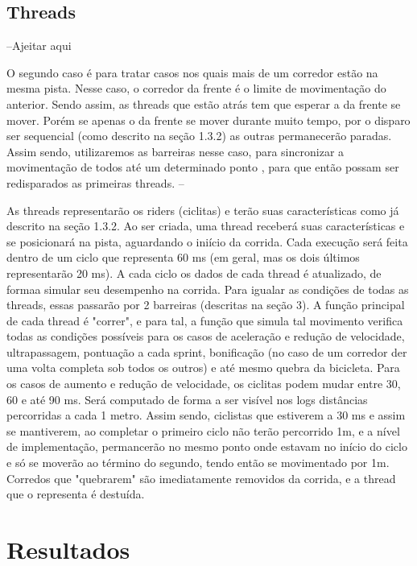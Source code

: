 \documentclass[12pt,a4paper]{article}
\begin{document}
\subsection{Threads}

--Ajeitar aqui

    O segundo caso é para tratar casos nos quais mais de um corredor estão na mesma pista. Nesse caso, o corredor da frente é o limite de movimentação do anterior. Sendo assim, as threads que estão atrás tem que esperar a da frente se mover. Porém se apenas o da frente se mover durante muito tempo, por o disparo ser sequencial (como descrito na seção 1.3.2) as outras permanecerão paradas. Assim sendo, utilizaremos as barreiras nesse caso, para sincronizar a movimentação de todos até um determinado ponto , para que então possam ser redisparados as primeiras threads. 
--

	As threads representarão os riders (ciclitas) e terão suas características como já descrito na seção 1.3.2. Ao ser criada, uma thread receberá suas características e se posicionará na pista, aguardando o iniício da corrida. Cada execução será feita dentro de um ciclo que representa 60 ms (em geral, mas os dois últimos representarão 20 ms). A cada ciclo os dados de cada thread é atualizado, de formaa simular seu desempenho na corrida. Para igualar as condições de todas as threads, essas passarão por 2 barreiras (descritas na seção 3).
    A função principal de cada thread é "correr", e para tal, a função que simula tal movimento verifica todas as condições possíveis para os casos de aceleração e redução de velocidade, ultrapassagem, pontuação a cada sprint, bonificação (no caso de um corredor der uma volta completa sob todos os outros) e até mesmo quebra da bicicleta.
    Para os casos de aumento e redução de velocidade, os ciclitas podem mudar entre 30, 60 e até 90 ms. Será computado de forma a ser visível nos logs distâncias percorridas a cada 1 metro. Assim sendo, ciclistas que estiverem a 30 ms e assim se mantiverem, ao completar o primeiro ciclo não terão percorrido 1m, e a nível de implementação, permancerão no mesmo ponto onde estavam no início do ciclo e só se moverão ao término do segundo, tendo então se movimentado por 1m.
    Corredos que "quebrarem" são imediatamente removidos da corrida, e a thread que o representa é destuída.


\section{Resultados}
\end{document}
